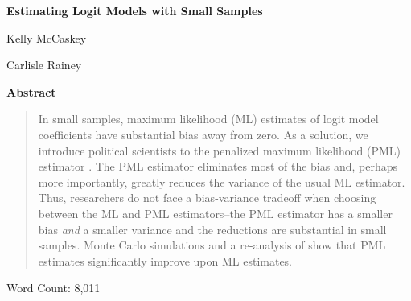 \documentclass[12pt]{article}
\begin{document}
\begin{center}
{\LARGE{\textbf{Estimating Logit Models with Small Samples}}}\\\vspace{2mm}

\vspace{10mm}

Kelly McCaskey

\vspace{3mm}

Carlisle Rainey
\end{center}

\vspace{10mm}

{\centerline{\textbf{Abstract}}}
\begin{quote}\noindent
In small samples, maximum likelihood (ML) estimates of logit model coefficients have substantial bias away from zero.
As a solution, we introduce political scientists to the penalized maximum likelihood (PML) estimator \citep{Firth1993}.
The PML estimator eliminates most of the bias and, perhaps more importantly, greatly reduces the variance of the usual ML estimator.
Thus, researchers do not face a bias-variance tradeoff when choosing between the ML and PML estimators--the PML estimator has a smaller bias \textit{and} a smaller variance and the reductions are substantial in small samples.
Monte Carlo simulations and a re-analysis of \cite{GeorgeEpstein1992} show that PML estimates significantly improve upon ML estimates.
 \end{quote}

 \vspace{5mm}
 \begin{center}
 Word Count: 8,011
 \end{center}
\end{document}
